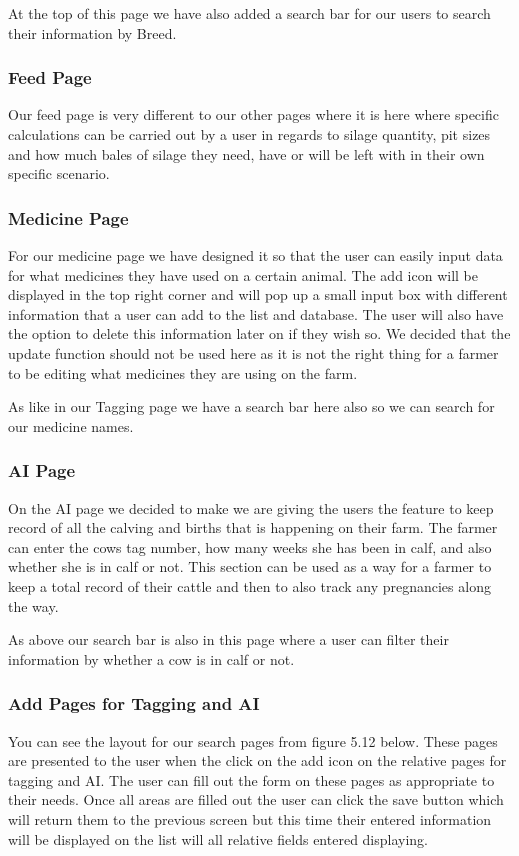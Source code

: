 \documentclass[12pt,a4paper,oneside,openany]{book}
\begin{document}
At the top of this page we have also added a search bar for our users to search their information by Breed.

\subsubsection{Feed Page}
Our feed page is very different to our other pages where it is here where specific calculations can be carried out by a user in regards to silage quantity, pit sizes and how much bales of silage they need, have or will be left with in their own specific scenario. 

\subsubsection{Medicine Page}
For our medicine page we have designed it so that the user can easily input data for what medicines they have used on a certain animal. The add icon will be displayed in the top right corner and will pop up a small input box with different information that a user can add to the list and database. The user will also have the option to delete this information later on if they wish so. We decided that the update function should not be used here as it is not the right thing for a farmer to be editing what medicines they are using on the farm.

As like in our Tagging page we have a search bar here also so we can search for our medicine names.

\subsubsection{AI Page}
On the AI page we decided to make we are giving the users the feature to keep record of all the calving and births that is happening on their farm. The farmer can enter the cows tag number, how many weeks she has been in calf, and also whether she is in calf or not. This section can be used as a way for a farmer to keep a total record of their cattle and then to also track any pregnancies along the way.

As above our search bar is also in this page where a user can filter their information by whether a cow is in calf or not.

\subsubsection{Add Pages for Tagging and AI}
You can see the layout for our search pages from figure 5.12  below. These pages are presented to the user when the click on the add icon on the relative pages for tagging and AI. The user can fill out the form on these pages as appropriate to their needs. Once all areas are filled out the user can click the save button which will return them to the previous screen but this time their entered information will be displayed on the list will all relative fields entered displaying. 
\end{document}
